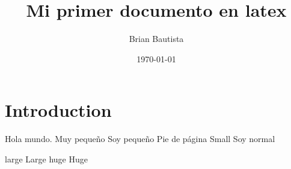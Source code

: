 \documentclass[12pt]{article} %
\title{Mi primer documento en latex}
\author{Brian Bautista}
\date{\today}
\begin{document}
\maketitle

\section{Introduction}

Hola mundo. \tiny{Muy pequeño} \scriptsize{Soy pequeño} \footnotesize{Pie de
página} \small{Small} \normalsize{Soy normal}

\large{large}
\Large{Large}
\huge{huge}
\Huge{Huge}
\end{document}

